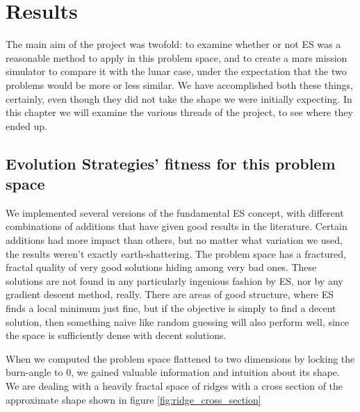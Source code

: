
\chapter{Results}
The main aim of the project was twofold: to examine whether or not ES was a reasonable method to apply in this problem space, and to create a mars mission simulator to compare it with the lunar case, under the expectation that the two problems would be more or less similar. We have accomplished both these things, certainly, even though they did not take the shape we were initially expecting. In this chapter we will examine the various threads of the project, to see where they ended up.

\section{Evolution Strategies' fitness for this problem space}
We implemented several versions of the fundamental ES concept, with different combinations of additions that have given good results in the literature. Certain additions had more impact than others, but no matter what variation we used, the results weren't exactly earth-shattering. The problem space has a fractured, fractal quality of very good solutions hiding among very bad ones. These solutions are not found in any particularly ingenious fashion by ES, nor by any gradient descent method, really. There are areas of good structure, where ES finds a local minimum just fine, but if the objective is simply to find a decent solution, then something naive like random guessing will also perform well, since the space is sufficiently dense with decent solutions. 

When we computed the problem space flattened to two dimensions by locking the burn-angle to 0, we gained valuable information and intuition about its shape. We are dealing with a heavily fractal space of ridges with a cross section of the approximate shape shown in figure \ref{fig:ridge_cross_section}

